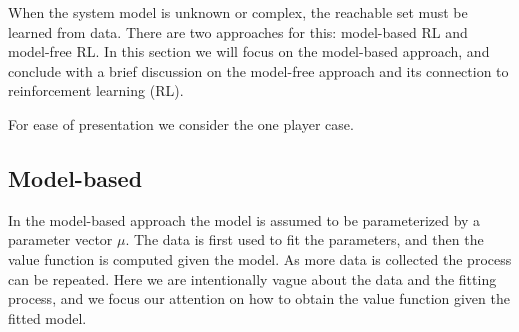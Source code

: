 
When the system model is unknown or complex, the reachable set must be learned from data. There are two approaches for this: model-based RL and model-free RL. In this section we will focus on the model-based approach, and conclude with a brief discussion on the model-free approach and its connection to reinforcement learning (RL).

For ease of presentation we consider the one player case.

\subsection{Model-based}

In the model-based approach the model is assumed to be parameterized by a parameter vector $\mu$. %
%
The data is first used to fit the parameters, and then the value function is computed given the model. As more data is collected the process can be repeated. Here we are intentionally vague about the data and the fitting process, and we focus our attention on how to obtain the value function given the fitted model.

